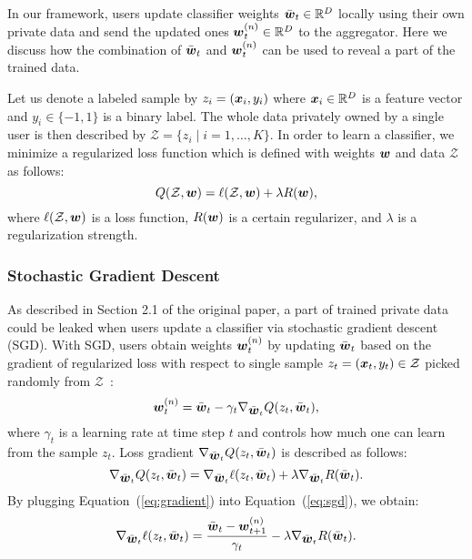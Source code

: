 \documentclass[10pt,twocolumn,letterpaper]{article}
\def\vct#1{\mbox{\boldmath $#1$}}
\def\ui#1{^{(#1)}}
\def\barw{\bar{\vct{w}}}
\def\wui{\vct{w}\ui{n}}
\begin{document}
In our framework, users update classifier weights $\barw_t\in\mathbb{R}^D$ locally using their own private data and send the updated ones $\wui_t\in\mathbb{R}^D$ to the aggregator. Here we discuss how the combination of $\barw_t$ and $\wui_t$ can be used to reveal a part of the trained data.

Let us denote a labeled sample by $z_i=(\vct{x}_i, y_i)$ where $\vct{x}_i\in\mathbb{R}^D$ is a feature vector and $y_i\in\{-1, 1\}$ is a binary label. The whole data privately owned by a single user is then described by $\mathcal{Z}=\{z_i\mid i=1,\dots,K\}$. In order to learn a classifier, we minimize a regularized loss function which is defined with weights $\vct{w}$ and data $\mathcal{Z}$ as follows:
\begin{equation}
Q(\mathcal{Z}, \vct{w})=\ell (\mathcal{Z},\vct{w}) + \lambda R(\vct{w}),
\end{equation}
where $\ell (\mathcal{Z}, \vct{w})$ is a loss function, $R(\vct{w})$ is a certain regularizer, and $\lambda$ is a regularization strength. 

\subsubsection{Stochastic Gradient Descent}
As described in Section 2.1 of the original paper, a part of trained private data could be leaked when users update a classifier via stochastic gradient descent (SGD). With SGD, users obtain weights $\wui_t$ by updating $\barw_t$ based on the gradient of regularized loss with respect to single sample $z_t=(\vct{x}_t, y_t)\in \mathcal{Z}$ picked randomly from $\mathcal{Z}$~\cite{Bottou2012}:
\begin{equation}
    \wui_t = \barw_t -\gamma_t \nabla_{\barw_t}Q(z_t, \barw_t),
    \label{eq:sgd}
\end{equation}
where $\gamma_t$ is a learning rate at time step $t$ and controls how much one can learn from the sample $z_t$. Loss gradient $\nabla_{\barw_t}Q(z_t, \barw_t)$ is described as follows: 
\begin{equation}
    \nabla_{\barw_t}Q(z_t, \barw_t) = \nabla_{\barw_t}\ell (z_t, \barw_t) + \lambda\nabla_{\barw_t} R(\barw_t).
    \label{eq:gradient}
\end{equation}
By plugging Equation~(\ref{eq:gradient}) into Equation~(\ref{eq:sgd}), we obtain:
\begin{equation}
\nabla_{\barw_t}\ell(z_t, \barw_t) = \frac{\barw_t - \wui_{t+1}}{\gamma_t} - \lambda \nabla_{\barw_t}R(\barw_t).
\label{eq:get_grad}
\end{equation}
\end{document}
